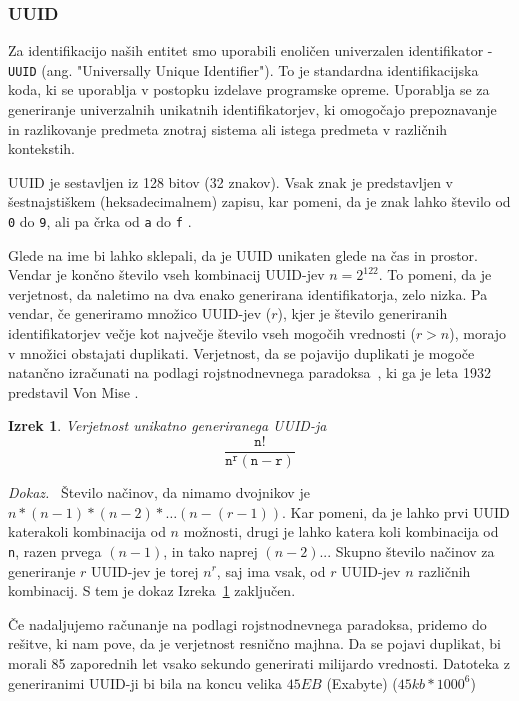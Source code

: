 \documentclass[a4paper, 12pt]{book}
\newtheorem{izrek}{Izrek}[chapter]
\newenvironment{dokaz}{\emph{Dokaz.}\ }{\hspace{\fill}{$\Box$}}
\begin{document}
\subsubsection{UUID}
Za identifikacijo naših entitet smo uporabili enoličen univerzalen identifikator - \verb=UUID= (ang. "Universally Unique Identifier"). To je standardna identifikacijska koda, ki se uporablja v postopku izdelave programske opreme. Uporablja se za generiranje univerzalnih unikatnih identifikatorjev, ki omogočajo prepoznavanje in razlikovanje predmeta znotraj sistema ali istega predmeta v različnih kontekstih.

UUID je sestavljen iz 128 bitov (32 znakov). Vsak znak je predstavljen v šestnajstiškem (heksadecimalnem) zapisu, kar pomeni, da je znak lahko število od \verb=0= do \verb=9=, ali pa črka od \verb=a= do \verb=f= \cite{uuid-rfc}.

Glede na ime bi lahko sklepali, da je UUID unikaten glede na čas in prostor. Vendar je končno število vseh kombinacij UUID-jev $n=2^{122}$. To pomeni, da je verjetnost, da naletimo na dva enako generirana identifikatorja, zelo nizka.
Pa vendar, če generiramo množico UUID-jev ($r$), kjer je število generiranih identifikatorjev večje kot največje število vseh mogočih vrednosti ($r > n$), morajo v množici obstajati duplikati. Verjetnost, da se pojavijo duplikati je mogoče natančno izračunati na podlagi rojstnodnevnega paradoksa~\cite{birthday-problem-what-is}, ki ga je leta 1932 predstavil Von Mise \cite{birthday-problem-inventor}.

\begin{izrek}
\label{iz:1}
Verjetnost unikatno generiranega UUID-ja
\begin{equation}
\mathtt{\frac{n!}{n^{r}(n-r)}}
\label{eq:1}
\end{equation}
\end{izrek}

\begin{dokaz}
Število načinov, da nimamo dvojnikov je $n*(n-1)*(n-2)* …(n-(r-1))$. Kar pomeni, da je lahko prvi UUID katerakoli kombinacija od $n$ možnosti, drugi je lahko katera koli kombinacija od \verb=n=, razen prvega $(n-1)$, in tako naprej $(n-2)$... Skupno število načinov za generiranje $r$ UUID-jev je torej $n^r$, saj ima vsak, od $r$ UUID-jev $n$ različnih kombinacij.
S tem je dokaz Izreka~\ref{iz:1} zaključen.
\end{dokaz}

Če nadaljujemo računanje na podlagi rojstnodnevnega paradoksa, pridemo do rešitve, ki nam pove, da je verjetnost resnično majhna. Da se pojavi duplikat, bi morali 85 zaporednih let vsako sekundo generirati milijardo vrednosti. Datoteka z generiranimi UUID-ji bi bila na koncu velika $45EB$ (Exabyte) ($45kb*1000^6$) \cite{uuid-collisions}
\end{document}
